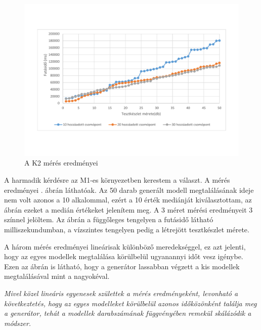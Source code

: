 \begin{figure}[htp]
	\centering                                                    
	\includegraphics[width=1\textwidth]{figures/statisticsPlottalA}
	\caption{A K2 mérés eredményei}
	\label{fig:AmeresEredmeny}
\end{figure}
                                                                                                                                                                                                                                                                                           
A harmadik kérdésre az M1-es környezetben kerestem a választ. A mérés eredményei . ábrán láthatóak. Az 50 darab generált modell megtalálásának ideje nem volt azonos a 10 alkalommal, ezért a 10 érték mediánját kiválasztottam, az ábrán ezeket a medián értékeket jelenítem meg. A 3 méret mérési eredményeit 3 színnel jelöltem. Az ábrán a függőleges tengelyen a futásidő látható milliszekundumban,  a vízszintes tengelyen pedig a létrejött tesztkészlet mérete.  

A három mérés eredményei lineárisak különböző meredekséggel, ez azt jelenti, hogy az egyes modellek megtalálása körülbelül ugyanannyi időt vesz igénybe. Ezen az ábrán is látható, hogy a generátor lassabban végzett a kis modellek megtalálásával mint a nagyokéval. 
                                                                                                               
\textit{Mivel közel lineáris egyenesek születtek a mérés eredményeként, levonható a következtetés, hogy az egyes modelleket körülbelül azonos időközönként találja meg a generátor,  tehát a modellek darabszámának függvényében remekül skálázódik a módszer.}


